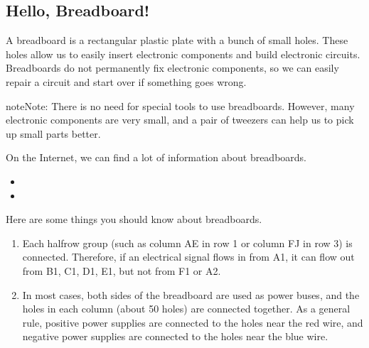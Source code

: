 \documentclass[a4paper,11pt,english]{sphinxmanual}
\begin{document}
\subsection{Hello, Breadboard!}
\label{\detokenize{Get_Started_with_Arduino/How_to_Build_the_Circuit:hello-breadboard}}\label{\detokenize{Get_Started_with_Arduino/How_to_Build_the_Circuit:bc-bb}}
\sphinxAtStartPar
A breadboard is a rectangular plastic plate with a bunch of small holes.
These holes allow us to easily insert electronic components and build electronic circuits.
Breadboards do not permanently fix electronic components, so we can easily repair a circuit and start over if something goes wrong.

\begin{sphinxadmonition}{note}{Note:}
\sphinxAtStartPar
There is no need for special tools to use breadboards. However, many electronic components are very small, and a pair of tweezers can help us to pick up small parts better.
\end{sphinxadmonition}

\sphinxAtStartPar
On the Internet, we can find a lot of information about breadboards.
\begin{itemize}
\item {} 
\sphinxAtStartPar
{}

\item {} 
\sphinxAtStartPar
{}

\end{itemize}

\sphinxAtStartPar
Here are some things you should know about breadboards.



\begin{enumerate}
%
\item {} 
\sphinxAtStartPar
Each half\sphinxhyphen{}row group (such as column A\sphinxhyphen{}E in row 1 or column F\sphinxhyphen{}J in row 3) is connected. Therefore, if an electrical signal flows in from A1, it can flow out from B1, C1, D1, E1, but not from F1 or A2.

\item {} 
\sphinxAtStartPar
In most cases, both sides of the breadboard are used as power buses, and the holes in each column (about 50 holes) are connected together. As a general rule, positive power supplies are connected to the holes near the red wire, and negative power supplies are connected to the holes near the blue wire.

\end{enumerate}
\end{document}
